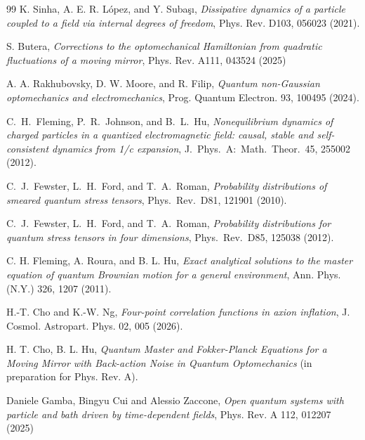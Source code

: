 \documentclass[%
amssymb,preprint,preprintnumbers,nofootinbib,superscriptaddress]{revtex4}
\begin{document}
\begin{thebibliography}{99}
    K. Sinha, A. E. R. L\'opez, and Y. Suba{\c s}{\i}, \textit{Dissipative dynamics of a particle coupled to a field via internal degrees of freedom}, Phys. Rev. D103, 056023 (2021).
 


S. Butera, \textit{Corrections to the optomechanical Hamiltonian from quadratic fluctuations of a moving mirror}, Phys. Rev. A111, 043524 (2025)

A. A. Rakhubovsky, D. W. Moore, and R. Filip, \textit{Quantum non-Gaussian optomechanics and electromechanics}, Prog. Quantum Electron. 93, 100495 (2024).




C.~H.~Fleming, P.~R.~Johnson, and B.~L.~Hu, \textit{Nonequilibrium dynamics of charged particles in a quantized electromagnetic field: causal, stable and self-consistent dynamics from 1/c expansion}, J.\ Phys.\ A:\ Math.\ Theor.\ 45, 255002 (2012).



C.~J.~Fewster, L.~H.~Ford, and T.~A.~Roman, \textit{Probability distributions of smeared quantum stress tensors}, Phys.\ Rev.\ D81, 121901 (2010).

C.~J.~Fewster, L.~H.~Ford, and T.~A.~Roman, \textit{Probability distributions for quantum stress tensors in four dimensions},
Phys.\ Rev.\ D85, 125038 (2012).


C. H. Fleming, A. Roura, and B. L. Hu, \textit{Exact analytical solutions to the master equation of quantum Brownian motion for a general environment}, Ann. Phys. (N.Y.) 326, 1207 (2011).




H.-T. Cho and K.-W. Ng, \textit{Four-point correlation functions in axion inflation}, J. Cosmol. Astropart. Phys. 02, 005 (2026).



H. T. Cho, B. L. Hu,  \textit{Quantum Master and Fokker-Planck Equations for a Moving Mirror with Back-action Noise in Quantum Optomechanics} (in preparation for Phys. Rev. A).  



Daniele Gamba, Bingyu Cui  and Alessio Zaccone, {\it Open quantum systems with particle and bath driven by time-dependent fields}, Phys. Rev. A 112, 012207 (2025)

\end{thebibliography}
\end{document}
